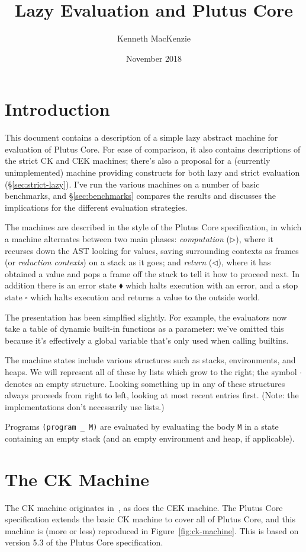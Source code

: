 \documentclass[a4paper]{article}
\author{Kenneth MacKenzie}
\date{November 2018}
\title{Lazy Evaluation and Plutus Core}
\begin{document}
\maketitle
\section{Introduction}
This document contains a description of a simple lazy abstract machine
for evaluation of Plutus Core.  For ease of comparison, it also
contains descriptions of the strict CK and CEK machines; there's also
a proposal for a (currently unimplemented) machine providing
constructs for both lazy and strict evaluation
(\S\ref{sec:strict-lazy}).  I've run the various machines on a
number of basic benchmarks, and \S\ref{sec:benchmarks} compares
the results and discusses the implications for the different
evaluation strategies.

The machines are described in the style of the Plutus Core
specification, in which a machine alternates between two main phases:
\textit{computation} ($\triangleright$), where it recurses down the
AST looking for values, saving surrounding contexts as frames (or
\textit{reduction contexts}) on a stack as it goes; and
\textit{return} ($\triangleleft$), where it has obtained a value and
pops a frame off the stack to tell it how to proceed next.  In
addition there is an error state $\blacklozenge$ which halts execution
with an error, and a stop state $\square$ which halts execution and
returns a value to the outside world. 

The presentation has been simplfied slightly. For example, the
evaluators now take a table of dynamic built-in functions as a
parameter: we've omitted this because it's effectively a global
variable that's only used when calling builtins.

The machine states include various structures such as stacks,
environments, and heaps.  We will represent all of these by lists
which grow to the right; the symbol $\cdot$ denotes an empty
structure.  Looking something up in any of these structures always
proceeds from right to left, looking at most recent entries first.
(Note: the implementations don't necessarily use lists.)

Programs \texttt{(program \_ M)} are evaluated by evaluating the body
\texttt{M} in a state containing an empty stack (and an empty environment
and heap, if applicable).
 


\section{The CK Machine}
The CK machine originates in~\cite{Felleisen-Cek}, as does the CEK
machine.  The Plutus Core specification extends the basic CK machine
to cover all of Plutus Core, and this machine is (more or less)
reproduced in Figure~\ref{fig:ck-machine}.  This is based on version
5.3 of the Plutus Core specification.
\end{document}
